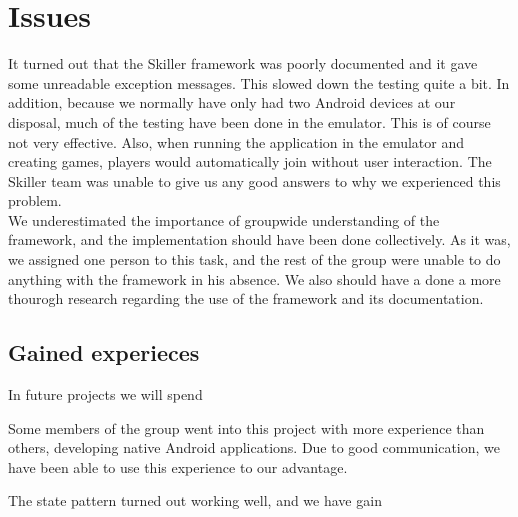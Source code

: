 \section{Issues}


It turned out that the Skiller framework was poorly documented and it gave some unreadable exception messages. This slowed down the testing quite a bit. In addition, because we normally have only had two Android devices at our disposal, much of the testing have been done in the emulator. This is of course not very effective. Also, when running the application in the emulator and creating games, players would automatically join without user interaction. The Skiller team was unable to give us any good answers to why we experienced this problem.\\

We underestimated the importance of groupwide understanding of the framework, and the implementation should have been done collectively. As it was, we assigned one person to this task, and the rest of the group were unable to do anything with the framework in his absence. We also should  have a done a more thourogh research regarding the use of the framework and its documentation. \\

\subsection{Gained experieces}
In future projects we will spend 



Some members of the group went into this project with more experience than others, developing native Android applications. Due to good communication, we have been able to use this experience to our advantage.

The state pattern turned out working well, and we have gain